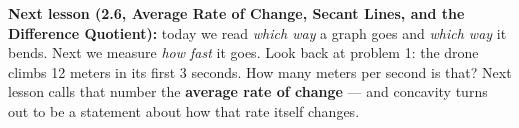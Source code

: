 \documentclass[10pt]{article}
\begin{document}
\vspace{0.06in}

\boxguard[8]
\begin{spiralbox}
\small
\textbf{Next lesson (2.6, Average Rate of Change, Secant Lines, and the Difference
Quotient):} today we read \emph{which way} a graph goes and \emph{which way} it bends. Next we
measure \emph{how fast} it goes. Look back at problem 1: the drone climbs 12 meters in its first
3 seconds. How many meters per second is that? Next lesson calls that number the
\textbf{average rate of change} --- and concavity turns out to be a statement about how that
rate itself changes.
\end{spiralbox}
\end{document}

